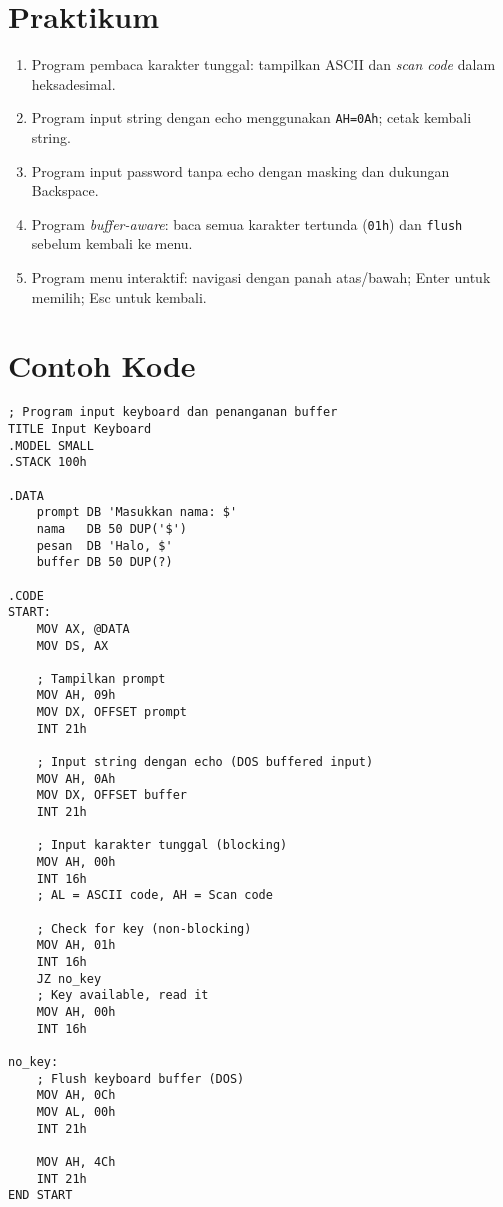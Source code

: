 \section{Praktikum}
\begin{enumerate}
  \item Program pembaca karakter tunggal: tampilkan ASCII dan \textit{scan code} dalam heksadesimal.
  \item Program input string dengan echo menggunakan \texttt{AH=0Ah}; cetak kembali string.
  \item Program input password tanpa echo dengan masking dan dukungan Backspace.
  \item Program \textit{buffer-aware}: baca semua karakter tertunda (\texttt{01h}) dan \texttt{flush} sebelum kembali ke menu.
  \item Program menu interaktif: navigasi dengan panah atas/bawah; Enter untuk memilih; Esc untuk kembali.
\end{enumerate}

\section{Contoh Kode}
\begin{verbatim}
; Program input keyboard dan penanganan buffer
TITLE Input Keyboard
.MODEL SMALL
.STACK 100h

.DATA
    prompt DB 'Masukkan nama: $'
    nama   DB 50 DUP('$')
    pesan  DB 'Halo, $'
    buffer DB 50 DUP(?)

.CODE
START:
    MOV AX, @DATA
    MOV DS, AX
    
    ; Tampilkan prompt
    MOV AH, 09h
    MOV DX, OFFSET prompt
    INT 21h
    
    ; Input string dengan echo (DOS buffered input)
    MOV AH, 0Ah
    MOV DX, OFFSET buffer
    INT 21h
    
    ; Input karakter tunggal (blocking)
    MOV AH, 00h
    INT 16h
    ; AL = ASCII code, AH = Scan code
    
    ; Check for key (non-blocking)
    MOV AH, 01h
    INT 16h
    JZ no_key
    ; Key available, read it
    MOV AH, 00h
    INT 16h
    
no_key:
    ; Flush keyboard buffer (DOS)
    MOV AH, 0Ch
    MOV AL, 00h
    INT 21h
    
    MOV AH, 4Ch
    INT 21h
END START
\end{verbatim}

